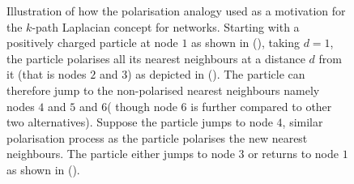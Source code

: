 \documentclass[10pt,a4paper]{article}
\begin{document}
\begin{figure}[!h]
\begin{subfigure}[b]{0.3\textwidth}
    	    	\end{subfigure}
    	    	\caption{ Illustration of how the polarisation analogy used as a motivation for the $k$-path Laplacian concept for networks. Starting with a positively charged particle at node $1$ as shown in (), taking $d=1$, the particle polarises all its nearest neighbours at a distance $d$ from it (that is nodes $2$ and $3$) as depicted in (). The particle can therefore jump to the non-polarised nearest neighbours namely nodes $4$ and $5$ and $6$( though node $6$ is further compared to other two alternatives). Suppose the particle jumps to node $4$, similar polarisation process as the particle polarises the new nearest neighbours. The particle either jumps to node $3$ or returns to node $1$ as shown in ().}
    	    	\label{1-path-particle}
    	    \end{figure}
    	    \vspace{1cm}
    	    
\end{document}
